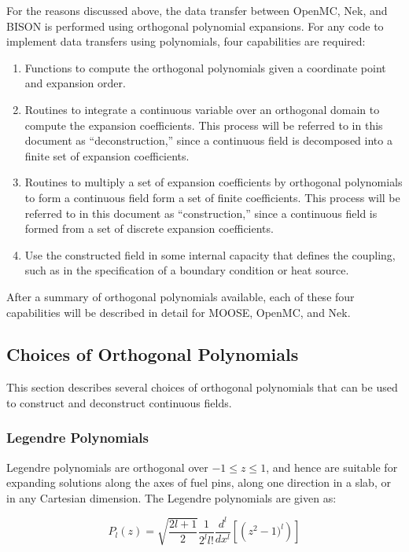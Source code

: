 \documentclass[10pt]{article}
\newcommand{\beq}{\begin{equation}}
\newcommand{\eeq}{\end{equation}}
\numberwithin{equation}{section} %
\begin{document}
For the reasons discussed above, the data transfer between OpenMC, Nek, and BISON is performed using orthogonal polynomial expansions. For any code to implement data transfers using polynomials, four capabilities are required:

\begin{enumerate}
\item Functions to compute the orthogonal polynomials given a coordinate point and expansion order.
\item Routines to integrate a continuous variable over an orthogonal domain to compute the expansion coefficients. This process will be referred to in this document as ``deconstruction,'' since a continuous field is decomposed into a finite set of expansion coefficients.
\item Routines to multiply a set of expansion coefficients by orthogonal polynomials to form a continuous field form a set of finite coefficients. This process will be referred to in this document as ``construction,'' since a continuous field is formed from a set of discrete expansion coefficients.
\item Use the constructed field in some internal capacity that defines the coupling, such as in the specification of a boundary condition or heat source.
\end{enumerate}

After a summary of orthogonal polynomials available, each of these four capabilities will be described in detail for MOOSE, OpenMC, and Nek. 

\subsection{Choices of Orthogonal Polynomials}
\label{sec:Polynomials}
This section describes several choices of orthogonal polynomials that can be used to construct and deconstruct continuous fields.

\subsubsection{Legendre Polynomials}

Legendre polynomials are orthogonal over \( -1 \leq z \leq 1\), and hence are suitable for expanding solutions along the axes of fuel pins, along one direction in a slab, or in any Cartesian dimension. The Legendre polynomials are given as:

\beq
\label{eq:LegendreScaled}
P_l(z)=\sqrt{\frac{2l+1}{2}}\frac{1}{2^ll!}\frac{d^l}{dx^l}\left\lbrack\left(z^2-1)^l\right)\right\rbrack
\eeq
\end{document}

